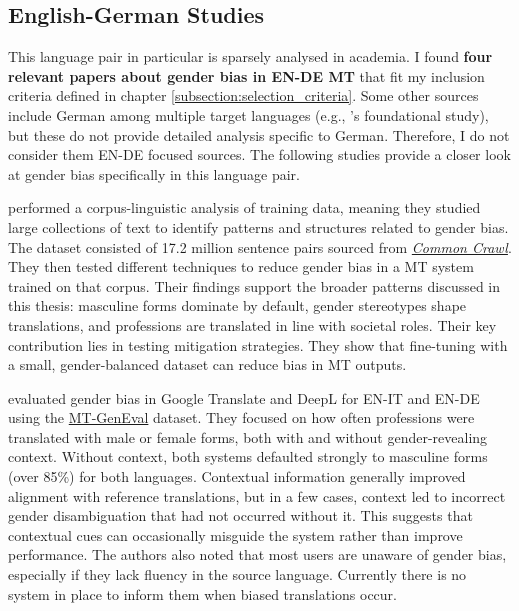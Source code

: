 





\subsection{English-German Studies}
This language pair in particular is sparsely analysed in academia. I found \textbf{four relevant papers about gender bias in EN-DE MT} that fit my inclusion criteria defined in chapter \ref{subsection:selection_criteria}. Some other sources include German among multiple target languages (e.g., \citeauthor{stanovskyEvaluatingGenderBias2019}'s foundational study), but these do not provide detailed analysis specific to German. Therefore, I do not consider them EN-DE focused sources. The following studies provide a closer look at gender bias specifically in this language pair.

\textbf{\cite{ullmannGenderBiasMachine2022}} performed a corpus-linguistic analysis of training data, meaning they studied large collections of text to identify patterns and structures related to gender bias. The dataset consisted of 17.2 million sentence pairs sourced from \href{https://commoncrawl.org/}{\textit{Common Crawl}}. They then tested different techniques to reduce gender bias in a MT system trained on that corpus. Their findings support the broader patterns discussed in this thesis: masculine forms dominate by default, gender stereotypes shape translations, and professions are translated in line with societal roles. Their key contribution lies in testing mitigation strategies. They show that fine-tuning with a small, gender-balanced dataset can reduce bias in MT outputs. 

\textbf{\citet{rescignoGenderBiasMachine2023}} evaluated gender bias in Google Translate and DeepL for EN-IT and EN-DE using the \href{https://github.com/amazon-science/machine-translation-gender-eval}{MT-GenEval} dataset. They focused on how often professions were translated with male or female forms, both with and without gender-revealing context. Without context, both systems defaulted strongly to masculine forms (over 85\%) for both languages. Contextual information generally improved alignment with reference translations, but in a few cases, context led to incorrect gender disambiguation that had not occurred without it. This suggests that contextual cues can occasionally misguide the system rather than improve performance. The authors also noted that most users are unaware of gender bias, especially if they lack fluency in the source language. Currently there is no system in place to inform them when biased translations occur.

